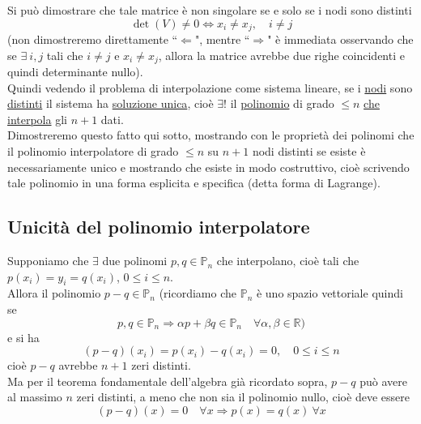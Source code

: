 Si può dimostrare che tale matrice è non singolare se e solo se i nodi sono distinti
\[ \det(V) \ne 0 \iff x_i \ne x_j, \quad i \ne j \]
(non dimostreremo direttamente ``$\Leftarrow$", mentre ``$\Rightarrow$" è immediata osservando che se $\exists \ i,j$ tali che $i\neq j$ e $x_i\neq x_j$, allora la matrice avrebbe due righe coincidenti e quindi determinante nullo).\\ 
Quindi vedendo il problema di interpolazione come sistema lineare, se i \uline{nodi} sono \uline{distinti} il sistema ha \uline{soluzione unica}, cioè \uline{$\exists !$} il \uline{polinomio} di grado $\leq n$ \uline{che interpola} gli $n+1$ dati.\\
Dimostreremo questo fatto qui sotto, mostrando con le proprietà dei polinomi che il polinomio interpolatore di grado $\leq n$ su $n+1$ nodi distinti se esiste è necessariamente unico e mostrando che esiste in modo costruttivo, cioè scrivendo tale polinomio in una forma esplicita e specifica (detta forma di Lagrange).

\subsection{Unicità del polinomio interpolatore}
Supponiamo che $\exists$ due polinomi $p,q \in \mathbb{P}_n$ che interpolano, cioè tali che $p(x_i)=y_i=q(x_i)$, $0\leq i \leq n$.\\ Allora il polinomio $p-q \in \mathbb{P}_n$ (ricordiamo che $\mathbb{P}_n$ è uno spazio vettoriale quindi se
\[ p, q \in \mathbb{P}_n \Rightarrow \alpha p + \beta q \in \mathbb{P}_n \quad \forall \alpha, \beta \in \mathbb{R}) \]
e si ha
\[ (p-q)(x_i) = p(x_i) - q(x_i) = 0, \quad 0 \le i \le n \]
cioè $p-q$ avrebbe $n+1$ zeri distinti.\\
Ma per il teorema fondamentale dell'algebra già ricordato sopra, $p-q$ può avere al massimo $n$ zeri distinti, a meno che non sia il polinomio nullo, cioè deve essere
\[ (p-q)(x) = 0 \quad \forall x \Rightarrow p(x) = q(x) \ \forall x \]

